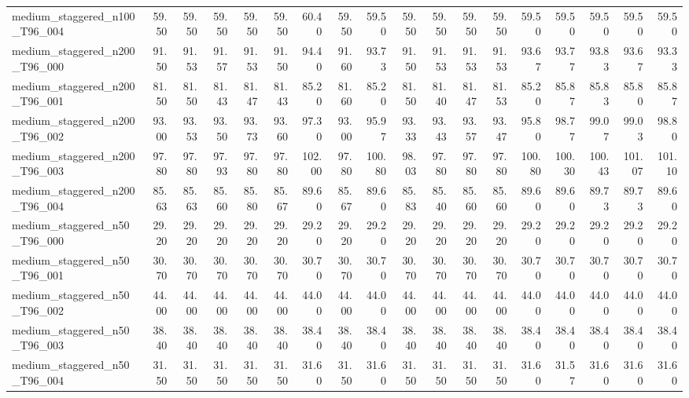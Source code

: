 \begin{table}[htbp]
\begin{tabular}{lrrrrrrrrrrrrrrrrr}
medium\_staggered\_n100\_T96\_004 & 59.50 & 59.50 & 59.50 & 59.50 & 59.50 & 60.40 & 59.50 & 59.50 & 59.50 & 59.50 & 59.50 & 59.50 & 59.50 & 59.50 & 59.50 & 59.50 & 59.50 \\
medium\_staggered\_n200\_T96\_000 & 91.50 & 91.53 & 91.57 & 91.53 & 91.50 & 94.40 & 91.60 & 93.73 & 91.50 & 91.53 & 91.53 & 91.53 & 93.67 & 93.77 & 93.83 & 93.67 & 93.33 \\
medium\_staggered\_n200\_T96\_001 & 81.50 & 81.50 & 81.43 & 81.47 & 81.43 & 85.20 & 81.60 & 85.20 & 81.50 & 81.40 & 81.47 & 81.53 & 85.20 & 85.87 & 85.83 & 85.80 & 85.87 \\
medium\_staggered\_n200\_T96\_002 & 93.00 & 93.53 & 93.50 & 93.73 & 93.60 & 97.30 & 93.00 & 95.97 & 93.33 & 93.43 & 93.57 & 93.47 & 95.80 & 98.77 & 99.07 & 99.03 & 98.80 \\
medium\_staggered\_n200\_T96\_003 & 97.80 & 97.80 & 97.93 & 97.80 & 97.80 & 102.00 & 97.80 & 100.80 & 98.03 & 97.80 & 97.80 & 97.80 & 100.80 & 100.30 & 100.43 & 101.07 & 101.10 \\
medium\_staggered\_n200\_T96\_004 & 85.63 & 85.63 & 85.60 & 85.80 & 85.67 & 89.60 & 85.67 & 89.60 & 85.83 & 85.40 & 85.60 & 85.60 & 89.60 & 89.60 & 89.73 & 89.73 & 89.60 \\
medium\_staggered\_n50\_T96\_000 & 29.20 & 29.20 & 29.20 & 29.20 & 29.20 & 29.20 & 29.20 & 29.20 & 29.20 & 29.20 & 29.20 & 29.20 & 29.20 & 29.20 & 29.20 & 29.20 & 29.20 \\
medium\_staggered\_n50\_T96\_001 & 30.70 & 30.70 & 30.70 & 30.70 & 30.70 & 30.70 & 30.70 & 30.70 & 30.70 & 30.70 & 30.70 & 30.70 & 30.70 & 30.70 & 30.70 & 30.70 & 30.70 \\
medium\_staggered\_n50\_T96\_002 & 44.00 & 44.00 & 44.00 & 44.00 & 44.00 & 44.00 & 44.00 & 44.00 & 44.00 & 44.00 & 44.00 & 44.00 & 44.00 & 44.00 & 44.00 & 44.00 & 44.00 \\
medium\_staggered\_n50\_T96\_003 & 38.40 & 38.40 & 38.40 & 38.40 & 38.40 & 38.40 & 38.40 & 38.40 & 38.40 & 38.40 & 38.40 & 38.40 & 38.40 & 38.40 & 38.40 & 38.40 & 38.40 \\
medium\_staggered\_n50\_T96\_004 & 31.50 & 31.50 & 31.50 & 31.50 & 31.50 & 31.60 & 31.50 & 31.60 & 31.50 & 31.50 & 31.50 & 31.50 & 31.60 & 31.57 & 31.60 & 31.60 & 31.60 \\
\bottomrule
\end{tabular}
\end{table}
